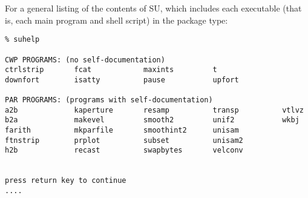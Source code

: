 For a general listing of the contents of SU, which includes each
executable (that is, each main program and shell script) in the package
type:
{\small\begin{verbatim}
% suhelp

CWP PROGRAMS: (no self-documentation)
ctrlstrip       fcat            maxints         t  
downfort        isatty          pause           upfort  

PAR PROGRAMS: (programs with self-documentation)
a2b             kaperture       resamp          transp          vtlvz  
b2a             makevel         smooth2         unif2           wkbj  
farith          mkparfile       smoothint2      unisam  
ftnstrip        prplot          subset          unisam2  
h2b             recast          swapbytes       velconv  


press return key to continue
....
\end{verbatim}}\noindent
